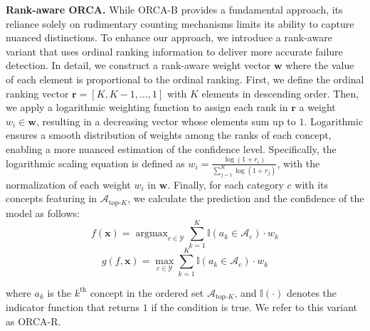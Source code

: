 

\noindent\textbf{Rank-aware ORCA.}
While ORCA-B provides a fundamental approach, its reliance solely on rudimentary counting mechanisms limits its ability to capture nuanced distinctions.
To enhance our approach, we introduce a rank-aware variant that uses ordinal ranking information to deliver more accurate failure detection.
In detail, we construct a rank-aware weight vector $\mathbf{w}$ where the value of each element is proportional to the ordinal ranking.
First, we define the ordinal ranking vector $\mathbf{r} = [K, K-1, \dots, 1]$ with $K$ elements in descending order.
Then, we apply a logarithmic weighting function to assign each rank in $\mathbf{r}$ a weight $w_i \in \mathbf{w}$, resulting in a decreasing vector whose elements sum up to $1$. 
Logarithmic ensures a smooth distribution of weights among the ranks of each concept, enabling a more nuanced estimation of the confidence level.
Specifically, the logarithmic scaling equation is defined as $w_i = \frac{\log(1 + r_i)}{\sum_{j=1}^{K} \log(1 + r_j)}$, with the normalization of each weight $w_i$ in $\mathbf{w}$. 
Finally, for each category $c$ with its concepts featuring in $\mathcal{A}_{\text{top-}K}$, we calculate the prediction and the confidence of the model as follows:
\begin{equation} \label{eq:orca-r-pred}
    f(\mathbf{x}) = \operatorname{argmax}_{c\in\mathcal{Y}} \sum_{k=1}^K \mathbb{I}(a_k \in \mathcal{A}_c) \cdot w_k 
\end{equation}
\begin{equation} \label{eq:orca-r-conf}
    g(f, \mathbf{x}) = \operatorname{max}_{c\in\mathcal{Y}} \sum_{k=1}^K \mathbb{I}(a_k \in \mathcal{A}_c) \cdot w_k 
\end{equation}

\noindent where $a_k$ is the $k^{\text{th}}$ concept in the ordered set $\mathcal{A}_{\text{top-}K}$, and $\mathbb{I}(\cdot)$ denotes the indicator function that returns $1$ if the condition is true. We refer to this variant as ORCA-R.